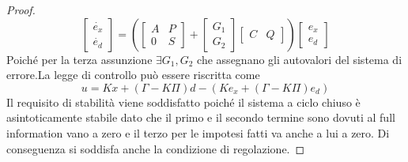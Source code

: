 \documentclass{article}
\theoremstyle{definition}
\begin{document}
\begin{proof}
\begin{equation*}
        \begin{bmatrix}
            \dot{e_{x}}\\\dot{e_{d}}
        \end{bmatrix}=\left(\begin{bmatrix}
            A & P\\ 0 &S
        \end{bmatrix}+\begin{bmatrix}
            G_{1}\\G_{2}
        \end{bmatrix}\begin{bmatrix}
            C & Q
        \end{bmatrix}\right)\begin{bmatrix}
            e_{x}\\e_{d}
        \end{bmatrix}
    \end{equation*}
    Poiché  per la terza assunzione \(\exists G_{1},G_{2}\) che assegnano gli autovalori del sistema di errore.\newline La legge di controllo può essere riscritta come \begin{equation*}
        u=Kx+(\Gamma-K\Pi)d-(Ke_{x}+(\Gamma-K\Pi)e_{d})
    \end{equation*}
    Il requisito di stabilità viene soddisfatto poiché il sistema  a ciclo chiuso è asintoticamente stabile dato che il primo e il secondo termine sono dovuti al full information vano a zero e il terzo per le impotesi fatti va anche a lui a zero. Di conseguenza si soddisfa anche la condizione di regolazione.
\end{proof}
\end{document}
